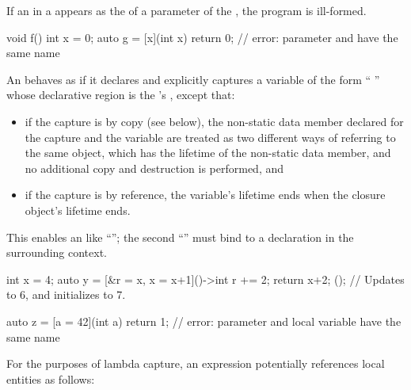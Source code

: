 \pnum
If an  in a  appears
as the  of a parameter of
the  ,
the program is ill-formed.
\begin{example}
\begin{codeblock}
void f() {
  int x = 0;
  auto g = [x](int x) { return 0; }    // error: parameter and  have the same name
}
\end{codeblock}
\end{example}

\pnum
An  behaves as if it declares and explicitly captures a
variable of
the form ``  \tcode{;}''
whose declarative region is the 's
, except that:
\begin{itemize}
\item if the capture is by copy (see below), the non-static data member
declared for the capture and the variable are treated as two different ways
of referring to the same object, which has the lifetime of the non-static
data member, and no additional copy and destruction is performed, and
\item if the capture is by reference, the variable's lifetime ends when the
closure object's lifetime ends.
\end{itemize}
\begin{note}
This enables an  like
``''; the second ``'' must bind to a
declaration in the surrounding context.
\end{note}
\begin{example}
\begin{codeblock}
int x = 4;
auto y = [&r = x, x = x+1]()->int {
            r += 2;
            return x+2;
         }();  // Updates  to 6, and initializes  to 7.

auto z = [a = 42](int a) { return 1; } // error: parameter and local variable have the same name
\end{codeblock}
\end{example}

\pnum
For the purposes of lambda capture,
an expression potentially references local entities as follows:

